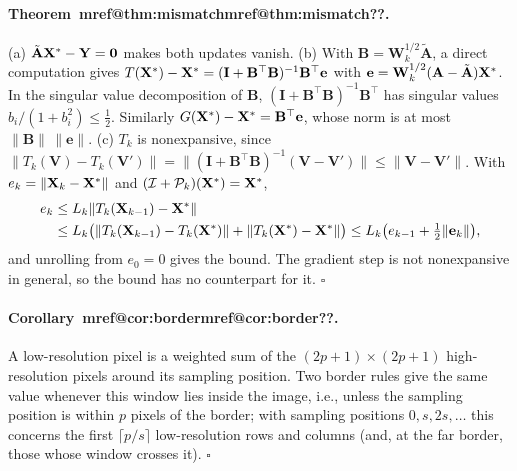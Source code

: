 \documentclass[10pt,twocolumn,letterpaper]{article}
\makeatletter
\newcommand{\mref}[1]{\ifcsname mref@#1\endcsname\csname mref@#1\endcsname\else\textbf{??}\fi}
\makeatother
\begin{document}
\paragraph{Theorem~\mref{thm:mismatch}.} (a) $\tilde{\mathbf{A}}\mathbf{X}^*-\mathbf{Y}=\mathbf{0}$ makes both updates vanish. (b) With $\mathbf{B}=\mathbf{W}_k^{1/2}\tilde{\mathbf{A}}$, a direct computation gives $T(\mathbf{X}^*)-\mathbf{X}^*=(\mathbf{I}+\mathbf{B}^{\top}\mathbf{B})^{-1}\mathbf{B}^{\top}\mathbf{e}$ with $\mathbf{e}=\mathbf{W}_k^{1/2}(\mathbf{A}-\tilde{\mathbf{A}})\mathbf{X}^*$. In the singular value decomposition of $\mathbf{B}$, $(\mathbf{I}+\mathbf{B}^{\top}\mathbf{B})^{-1}\mathbf{B}^{\top}$ has singular values $b_i/(1+b_i^2)\le\tfrac12$. Similarly $G(\mathbf{X}^*)-\mathbf{X}^*=\mathbf{B}^{\top}\mathbf{e}$, whose norm is at most $\|\mathbf{B}\|\,\|\mathbf{e}\|$. (c) $T_k$ is nonexpansive, since $\|T_k(\mathbf{V})-T_k(\mathbf{V}')\|=\|(\mathbf{I}+\mathbf{B}^{\top}\mathbf{B})^{-1}(\mathbf{V}-\mathbf{V}')\|\le\|\mathbf{V}-\mathbf{V}'\|$. With $e_k=\|\mathbf{X}_k-\mathbf{X}^*\|$ and $(\mathcal{I}+\mathcal{P}_k)(\mathbf{X}^*)=\mathbf{X}^*$,
\begin{equation*}
\begin{split}
e_k&\le L_k\|T_k(\mathbf{X}_{k-1})-\mathbf{X}^*\|\\
&\le L_k\big(\|T_k(\mathbf{X}_{k-1})-T_k(\mathbf{X}^*)\|+\|T_k(\mathbf{X}^*)-\mathbf{X}^*\|\big)\le L_k\big(e_{k-1}+\tfrac12\|\mathbf{e}_k\|\big),
\end{split}
\end{equation*}
and unrolling from $e_0=0$ gives the bound. The gradient step is not nonexpansive in general, so the bound has no counterpart for it. \hfill$\square$

\paragraph{Corollary~\mref{cor:border}.} A low-resolution pixel is a weighted sum of the $(2p+1)\times(2p+1)$ high-resolution pixels around its sampling position. Two border rules give the same value whenever this window lies inside the image, i.e., unless the sampling position is within $p$ pixels of the border; with sampling positions $0,s,2s,\dots$ this concerns the first $\lceil p/s\rceil$ low-resolution rows and columns (and, at the far border, those whose window crosses it). \hfill$\square$
\end{document}
